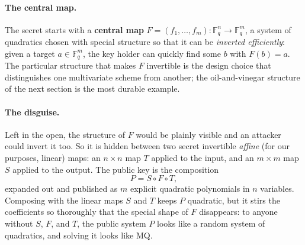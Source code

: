 \paragraph{The central map.}
The secret starts with a \textbf{central map} $F = (f_1,\dots,f_m) : \mathbb{F}_q^n \to \mathbb{F}_q^m$, a system of quadratics chosen with special structure so that it can be \emph{inverted efficiently}: given a target $a \in \mathbb{F}_q^m$, the key holder can quickly find some $b$ with $F(b) = a$. The particular structure that makes $F$ invertible is the design choice that distinguishes one multivariate scheme from another; the oil-and-vinegar structure of the next section is the most durable example.

\paragraph{The disguise.}
Left in the open, the structure of $F$ would be plainly visible and an attacker could invert it too. So it is hidden between two secret invertible \emph{affine} (for our purposes, linear) maps: an $n \times n$ map $T$ applied to the input, and an $m \times m$ map $S$ applied to the output. The public key is the composition
\[
P = S \circ F \circ T ,
\]
expanded out and published as $m$ explicit quadratic polynomials in $n$ variables. Composing with the linear maps $S$ and $T$ keeps $P$ quadratic, but it stirs the coefficients so thoroughly that the special shape of $F$ disappears: to anyone without $S$, $F$, and $T$, the public system $P$ looks like a random system of quadratics, and solving it looks like MQ.

